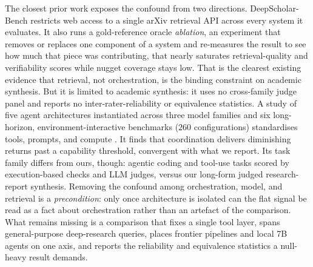 \documentclass[11pt]{article}
\begin{document}
The closest prior work exposes the confound from two directions. DeepScholar-Bench
\citep{deepscholarbench2025} restricts web access to a single arXiv retrieval API
across every system it evaluates. It also runs a gold-reference oracle \emph{ablation}, an
experiment that removes or replaces one component of a system and re-measures the result to
see how much that piece was contributing, that nearly saturates retrieval-quality and
verifiability scores while nugget coverage stays low. That is the
clearest existing evidence that retrieval, not orchestration, is the binding constraint on academic synthesis.
But it is limited to academic synthesis: it uses no
cross-family judge panel and reports no inter-rater-reliability or equivalence
statistics. A study of five agent architectures instantiated across three
model families and six long-horizon, environment-interactive benchmarks ($260$
configurations) standardises tools, prompts, and compute \citep{scaling_agents2025}.
It finds that coordination delivers diminishing
returns past a capability threshold, convergent with what we report. Its task
family differs from ours, though: agentic coding and tool-use tasks scored
by execution-based checks and LLM judges, versus our long-form judged
research-report synthesis. Removing the confound among orchestration, model, and retrieval is a
\emph{precondition}: only once
architecture is isolated can the flat signal be read as a fact about orchestration
rather than an artefact of the comparison. What remains
missing is a comparison that fixes a single tool layer, spans general-purpose
deep-research queries, places frontier pipelines and local 7B agents on one axis, and
reports the reliability and equivalence statistics a null-heavy result demands.
\end{document}
